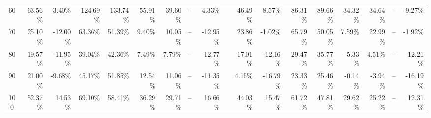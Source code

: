 \begin{table}[h!]
{\begin{tabular}{c rrrrrrrr c rrrrrrrr}
60 & 63.56\% & 3.40\% & 124.69\% & 133.74\% & 55.91\% & 39.60\% & -- & 4.33\% &  & 46.49\% & -8.57\% & 86.31\% & 89.66\% & 34.32\% & 34.64\% & -- & -9.27\% \\
70 & 25.10\% & -12.00\% & 63.36\% & 51.39\% & 9.40\% & 10.05\% & -- & -12.95\% &  & 23.86\% & -1.02\% & 65.79\% & 50.05\% & 7.59\% & 22.99\% & -- & -1.92\% \\
80 & 19.57\% & -11.95\% & 39.04\% & 42.36\% & 7.49\% & 7.79\% & -- & -12.77\% &  & 17.01\% & -12.16\% & 29.47\% & 35.77\% & -5.33\% & 4.51\% & -- & -12.21\% \\
90 & 21.00\% & -9.68\% & 45.17\% & 51.85\% & 12.54\% & 11.06\% & -- & -11.35\% &  & 4.15\% & -16.79\% & 23.33\% & 25.46\% & -0.14\% & -3.94\% & -- & -16.19\% \\
100 & 52.37\% & 14.53\% & 69.10\% & 58.41\% & 36.29\% & 29.71\% & -- & 16.66\% &  & 44.03\% & 15.47\% & 61.72\% & 47.81\% & 29.62\% & 25.22\% & -- & 12.31\% \\
\bottomrule
\end{tabular}%
}
\endgroup
\end{table}

